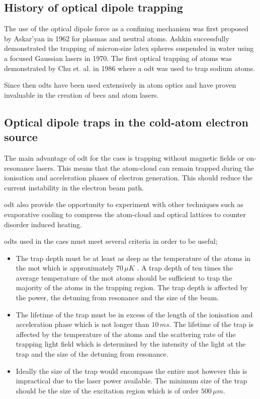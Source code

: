 \subsection{History of optical dipole trapping}
The use of the optical dipole force as a confining mechanism was first proposed by Askar'yan in 1962\cite{askaryan_effects_1962} for plasmas and neutral atoms. Ashkin successfully demonstrated the trapping of micron-size latex spheres suspended in water using a focused Gaussian lasers in 1970\cite{ashkin_acceleration_1970}. The first optical trapping of atoms was demonstrated by Chu et. al. in 1986\cite{chu_experimental_1986} where a \gls{odt} was used to trap sodium atoms.

Since then \glspl{odt} have been used extensively in atom optics and have proven invaluable in the creation of \glspl{bec} and atom lasers.

\subsection{Optical dipole traps in the cold-atom electron source}

The main advantage of \gls{odt} for the \gls{caes} is trapping without magnetic fields or on-resonance lasers. This means that the atom-cloud can remain trapped during the ionisation and acceleration phases of electron generation. This should reduce the current instability in the electron beam path.

\Gls{odt} also provide the opportunity to experiment with other techniques such as evaporative cooling to compress the atom-cloud and optical lattices\cite{fallani_bose-einstein_2005} to counter disorder induced heating. 

\Glspl{odt} used in the \gls{caes} must meet several criteria in order to be useful;
\begin{itemize}
    \item The trap depth must be at least as deep as the temperature of the atoms in the \gls{mot} which is approximately $70\,\unit{\mu K}$ \cite{mcculloch_arbitrarily_2011}. A trap depth of ten times the average temperature of the \gls{mot} atoms should be sufficient to trap the majority of the atoms in the trapping region. The trap depth is affected by the power, the detuning from resonance and the size of the beam.
    \item The lifetime of the trap must be in excess of the length of the  ionisation and acceleration phase which is not longer than $10\,\unit{ms}$. The lifetime of the trap is affected by the temperature of the atoms and the scattering rate of the trapping light field which is determined by the intensity of the light at the trap and the size of the detuning from resonance.
    \item Ideally the size of the trap would encompass the entire \gls{mot} however this is impractical due to the laser power available. The minimum size of the trap should be the size of the excitation region which is of order $500\,\unit{\mu m}$\cite{mcculloch_towards_2012}.
\end{itemize}

